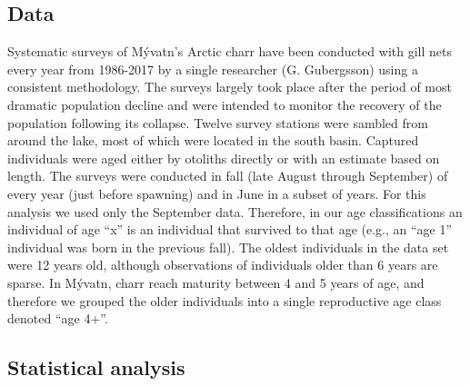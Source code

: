 \subsection*{Data} 

Systematic surveys of M\'{y}vatn’s Arctic charr have been conducted 
with gill nets every year from 1986-2017 by a single researcher (G. Gu{\dh}bergsson) 
using a consistent methodology. 
The surveys largely took place after the period of most dramatic population decline 
\citep{gudbergsson2004} 
and were intended to monitor the recovery of the population following its collapse. 
Twelve survey stations were sambled from around the lake,
most of which were located in the south basin. 
Captured individuals were aged either by otoliths directly or 
with an estimate based on length.
The surveys were conducted in fall (late August through September) 
of every year (just before spawning) and in June in a subset of years. 
For this analysis we used only the September data. 
Therefore, in our age classifications an individual of age ``x'' is an individual 
that survived to that age (e.g., an ``age 1'' individual was born in the previous fall). 
The oldest individuals in the data set were 12 years old, although observations 
of individuals older than 6 years are sparse. 
In M\'{y}vatn, charr reach maturity between 4 and 5 years of age, 
and therefore we grouped the older individuals into a single reproductive age class
denoted ``age 4+''.

\subsection*{Statistical analysis} 

